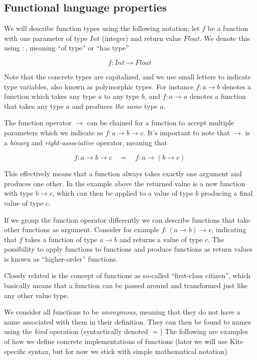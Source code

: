 \subsection{Functional language properties}
We will describe function types using the following notation; let $f$ be a function with one parameter of type $Int$ (integer) and return value $Float$. We denote this using $:$, meaning ``of type'' or ``has type''

\[ f: Int \to Float \]

Note that the concrete types are capitalized, and we use small letters to indicate type variables, also known as polymorphic types. For instance $f: a \to b$ denotes a function which takes any type $a$ to any type $b$, and $f: a \to a$ denotes a function that takes any type $a$ and produces \emph{the same} type $a$.

The function operator $\to$ can be chained for a function to accept multiple parameters which we indicate as $f: a \to b \to c$. It's important to note that $\to$ is a \emph{binary} and \emph{right-associative} operator, meaning that

\[ f: a \to b \to c \quad = \quad f: a \to (b \to c) \]

This effectively means that a function always takes exactly one argument and produces one other. In the example above the returned value is a new function with type $b \to c$, which can then be applied to a value of type $b$ producing a final value of type $c$.

If we group the function operator differently we can describe functions that take other functions as argument. Consider for example $f: (a \to b) \to c$, indicating that $f$ takes a function of type $a \to b$ and returns a value of type $c$. The possibility to apply functions to functions and produce functions as return values is known as ``higher-order'' functions.

Closely related is the concept of functions as so-called ``first-class citizen'', which basically means that a function can be passed around and transformed just like any other value type.

We consider all functions to be \emph{anonymous}, meaning that they do not have a name associated with them in their definition. They can then be found to names using the \emph{bind} operation (syntactically denoted $=$) The following are examples of how we define concrete implementations of functions (later we will use Kite specific syntax, but for now we stick with simple mathematical notation)

